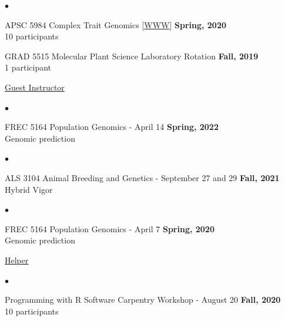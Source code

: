 \documentclass[margin,line,10pt]{res}
\newenvironment{list2}{
  \begin{list}{$\bullet$}{%
      \setlength{\itemsep}{0in}
      \setlength{\parsep}{0in} \setlength{\parskip}{0in}
      \setlength{\topsep}{0in} \setlength{\partopsep}{0in} 
      \setlength{\leftmargin}{0.2in}}}{\end{list}}
\begin{document}
\begin{resume}
\begin{list2}
         \vspace{0.5cm}
         
\item APSC 5984 Complex Trait Genomics [\textcolor{blue}{\href{http://morotalab.org/apsc5984-2020/APSC5984.html}{WWW}}] 
  \hfill {\bf Spring, 2020} \\
         10  participants %
  
     \vspace{0.5cm}

     
\item GRAD 5515 Molecular Plant Science Laboratory Rotation
  \hfill {\bf Fall, 2019} \\
  1 participant

\end{list2}

     \vspace{0.3cm}


\underline{Guest Instructor}



\vspace{0.4cm}
 \begin{list2}
 \item FREC 5164 Population Genomics - April 14  \hfill {\bf Spring, 2022} \\
   Genomic prediction
\end{list2}


\vspace{0.4cm}
 \begin{list2}
 \item ALS 3104 Animal Breeding and Genetics  - September 27 and 29  \hfill {\bf Fall, 2021} \\
   Hybrid Vigor 
\end{list2}

  \vspace{0.3cm}

 
\vspace{0.4cm}
 \begin{list2}
 \item FREC 5164 Population Genomics - April 7  \hfill {\bf Spring, 2020} \\
   Genomic prediction
\end{list2}


 \vspace{0.3cm}


\underline{Helper}
 \vspace{0.4cm}
 \begin{list2}
 \item Programming with R Software Carpentry Workshop - August 20  \hfill {\bf Fall, 2020} \\
   10  participants 
\end{list2}


\end{resume}
\end{document}
